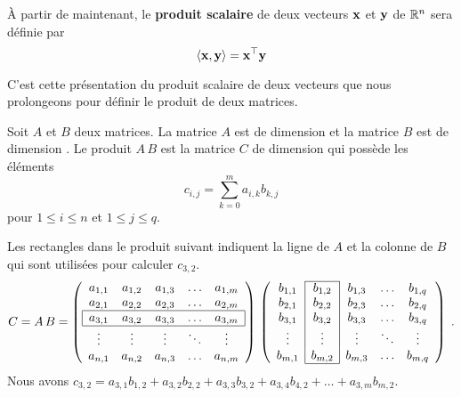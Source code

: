 {\begin{defn}
À partir de maintenant, le
{\bfseries produit scalaire} de deux vecteurs
$\mathbf{x}$ et $\mathbf{y}$ de $\mathbb{R}^n$ sera définie par
\[
  \left\langle{\mathbf{x}} , {\mathbf{y}}\right\rangle = \mathbf{x}^\top \mathbf{y}
\]
\label{pstransposed}
\end{defn}

C'est cette présentation du produit scalaire de deux vecteurs que nous
prolongeons pour définir le produit de deux matrices.

\begin{defn} 
Soit $A$ et $B$ deux matrices.  La matrice $A$ est de dimension
 et la matrice $B$ est de dimension .  Le produit
$A\,B$ est la matrice $C$ de dimension  qui possède les
éléments
\begin{equation}\label{matrixProd}
c_{i,j} = \sum_{k=0}^m a_{i,k} b_{k,j}
\end{equation}
pour $1\leq i \leq n$ et $1\leq j \leq q$.
\end{defn}

Les rectangles dans le produit suivant indiquent la ligne de $A$ et la
colonne de $B$ qui sont utilisées pour calculer $c_{3,2}$.
\[
C = A\,B =
\left(
\begin{array}{ccccc}
a_{1,1} & a_{1,2} & a_{1,3} & \ldots & a_{1,m} \\
a_{2,1} & a_{2,2} & a_{2,3} & \ldots & a_{2,m} \\
\hline
\multicolumn{1}{|c}{a_{3,1}} & a_{3,2} & a_{3,3} & \ldots &
\multicolumn{1}{c|}{a_{3,m}} \\
\hline
\vdots & \vdots & \vdots & \ddots & \vdots \\
a_{n,1} & a_{n,2} & a_{n,3} & \ldots & a_{n,m}
\end{array}
\right)
\,
\left(
\begin{array}{ccccc}
\cline{2-2}
b_{1,1} & \multicolumn{1}{|c|}{b_{1,2}} & b_{1,3} & \ldots & b_{1,q} \\
b_{2,1} & \multicolumn{1}{|c|}{b_{2,2}} & b_{2,3} & \ldots & b_{2,q} \\
b_{3,1} & \multicolumn{1}{|c|}{b_{3,2}} & b_{3,3} & \ldots & b_{3,q} \\
\vdots & \multicolumn{1}{|c|}{\vdots} & \vdots & \ddots & \vdots \\
b_{m,1} & \multicolumn{1}{|c|}{b_{m,2}} & b_{m,3} & \ldots & b_{m,q} \\
\cline{2-2}
\end{array}
\right) \; .
\]
Nous avons $c_{3,2} = a_{3,1}b_{1,2} + a_{3,2}b_{2,2} + a_{3,3}b_{3,2} +
a_{3,4}b_{4,2} + \ldots + a_{3,m}b_{m,2}$.

}
